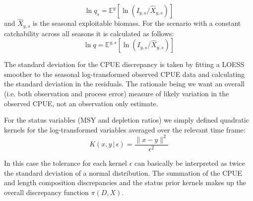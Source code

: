 \documentclass[12pt,a4paper,twoside,times,sky,standard]{csiroreport2017}
\newcommand{\wh}{\widehat}
\newcommand{\ds}{\displaystyle}
\newcommand{\eps}{\epsilon}
\begin{document}
\begin{equation*}
    \ds \ln q_s = \mathbb{E}^y\left[\ln\left(I_{y,s}/\wh{X}_{y,s}\right)\right]
\end{equation*}
and $\wh{X}_{y,s}$ is the seasonal exploitable biomass. For the scenario with a constant catchability across all seasons it is calculated as follows:
\begin{equation*}
    \ds \ln q = \mathbb{E}^{y,s}\left[\ln\left(I_{y,s}/\wh{X}_{y,s}\right)\right]
\end{equation*}

The standard deviation for the CPUE discrepancy is taken by fitting a LOESS smoother to the seasonal log-transformed observed CPUE data and calculating the standard deviation in the residuals. The rationale being we want an overall (i.e. both observation and process error) measure of likely variation in the observed CPUE, not an observation only estimate.

For the status variables (MSY and depletion ratios) we simply defined quadratic kernels for the log-transformed variables averaged over the relevant time frame:
\begin{equation*}
    \ds K(x,y\,|\,\eps) = \frac{\parallel x-y\parallel^2}{\eps^2}
\end{equation*}

In this case the tolerance for each kernel $\eps$ can basically be interpreted as twice the standard deviation of a normal distribution. The summation of the CPUE and length composition discrepancies and the status prior kernels makes up the overall discrepancy function $\pi(D,X)$.

\end{document}
